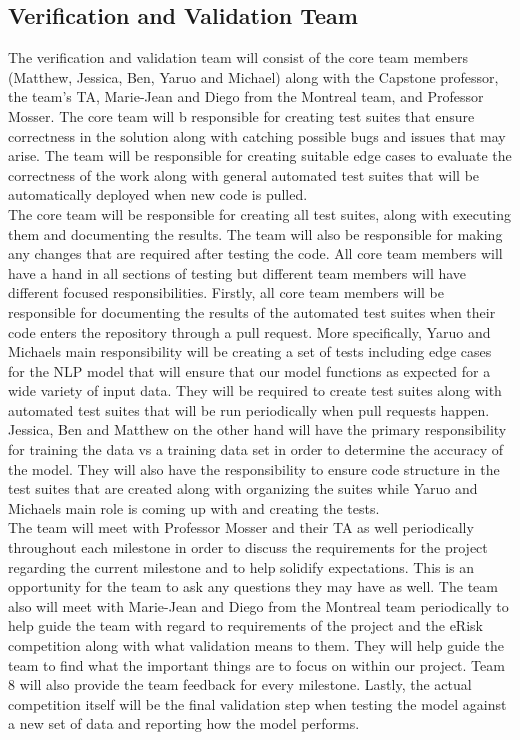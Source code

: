 \documentclass[12pt, titlepage]{article}
\begin{document}
  \subsection{Verification and Validation Team} \label{Verification and Validation Team}

  
  The verification and validation team will consist of the core team members (Matthew, Jessica, Ben, Yaruo and Michael) along with the Capstone professor, the team's TA, Marie-Jean and Diego from the Montreal team, and Professor Mosser.  The core team will b responsible for creating test suites that ensure correctness in the solution along with catching possible bugs and issues that may arise. The team will be responsible for creating suitable edge cases to evaluate the correctness of the work along with general automated test suites that will be automatically deployed when new code is pulled.\\
  
  The core team will be responsible for creating all test suites, along with executing them and documenting the results. The team will also be responsible for making any changes that are required after testing the code. All core team members will have a hand in all sections of testing but different team members will have different focused responsibilities. Firstly, all core team members will be responsible for documenting the results of the automated test suites when their code enters the repository through a pull request. More specifically, Yaruo and Michaels main responsibility will be creating a set of tests including edge cases for the NLP model that will ensure that our model functions as expected for a wide variety of input data. They will be required to create test suites along with automated test suites that will be run periodically when pull requests happen. Jessica, Ben and Matthew on the other hand will have the primary responsibility for training the data vs a training data set in order to determine the accuracy of the model. They will also have the responsibility to ensure code structure in the test suites that are created along with organizing the suites while Yaruo and Michaels main role is coming up with and creating the tests.\\ 
  
  The team will meet with Professor Mosser and their TA as well periodically throughout each milestone in order to discuss the requirements for the project regarding the current milestone and to help solidify expectations. This is an opportunity for the team to ask any questions they may have as well. The team also will meet with Marie-Jean and Diego from the Montreal team periodically to help guide the team with regard to requirements of the project and the eRisk competition along with what validation means to them. They will help guide the team to find what the important things are to focus on within our project. Team 8 will also provide the team feedback for every milestone. Lastly, the actual competition itself will be the final validation step when testing the model against a new set of data and reporting how the model performs.\\
\end{document}
